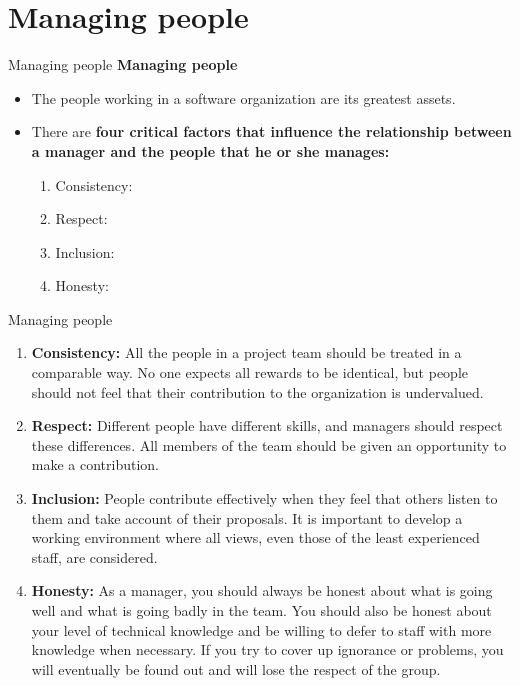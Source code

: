 \documentclass{beamer}
\begin{document}
\section{Managing people}
\begin{frame}{Managing people}
	\textbf{Managing people}
\begin{itemize}
	\item The people working in a software organization are its greatest assets.
	\item There are \textbf{four critical factors that influence the relationship between a manager and the people that 
		he or she manages:}

	\begin{enumerate}
		\item Consistency:
		\item Respect:
		\item Inclusion:
		\item Honesty: 
	\end{enumerate}
\end{itemize}
\end{frame}
\begin{frame}{Managing people}
		\begin{enumerate}
			\item \textbf{Consistency:} 
			 All the people in a project team should be treated in a comparable way. No one 
				expects all rewards to be identical, but people should not feel that their contribution to the 
				organization is undervalued.

			
			\item \textbf{Respect:}
				  Different people have different skills, and managers should respect these differences. All 
				members of the team should be given an opportunity to make a contribution.

	
			\item \textbf{Inclusion:}
				 People contribute effectively when they feel that others listen to them and take 
				account of their proposals. It is important to develop a working environment where all views, 
				even those of the least experienced staff, are considered.
			\item \textbf{Honesty: }
			 As a manager, you should always be honest about what is going well and what is going 
				badly in the team. You should also be honest about your level of technical knowledge and be 
				willing to defer to staff with more knowledge when necessary. If you try to cover up ignorance or 
				problems, you will eventually be found out and will lose the respect of the group.
		\end{enumerate}
\end{frame}
\end{document}

